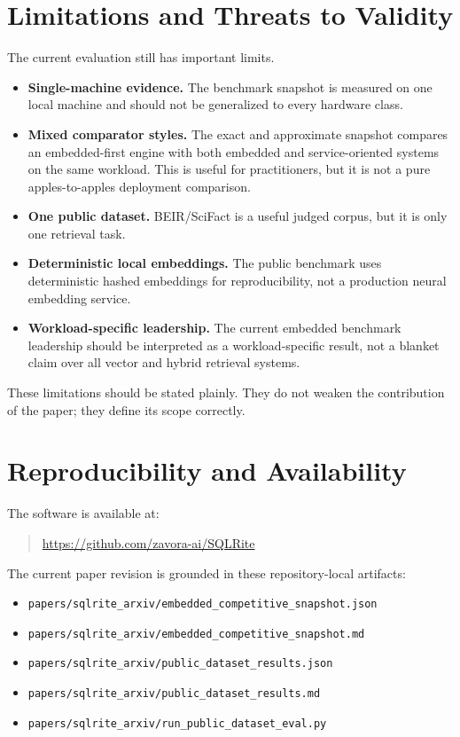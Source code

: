 \documentclass[11pt]{article}
\begin{document}
\section{Limitations and Threats to Validity}
The current evaluation still has important limits.
\begin{itemize}[leftmargin=*, itemsep=0.2em]
  \item \textbf{Single-machine evidence.} The benchmark snapshot is measured on one local machine and should not be generalized to every hardware class.
  \item \textbf{Mixed comparator styles.} The exact and approximate snapshot compares an embedded-first engine with both embedded and service-oriented systems on the same workload. This is useful for practitioners, but it is not a pure apples-to-apples deployment comparison.
  \item \textbf{One public dataset.} BEIR/SciFact is a useful judged corpus, but it is only one retrieval task.
  \item \textbf{Deterministic local embeddings.} The public benchmark uses deterministic hashed embeddings for reproducibility, not a production neural embedding service.
  \item \textbf{Workload-specific leadership.} The current embedded benchmark leadership should be interpreted as a workload-specific result, not a blanket claim over all vector and hybrid retrieval systems.
\end{itemize}

These limitations should be stated plainly. They do not weaken the contribution of the paper; they define its scope correctly.

\section{Reproducibility and Availability}
The software is available at:
\begin{quote}
  \url{https://github.com/zavora-ai/SQLRite}
\end{quote}

The current paper revision is grounded in these repository-local artifacts:
\begin{itemize}[leftmargin=*, itemsep=0.2em]
  \item \texttt{papers/sqlrite\_arxiv/embedded\_competitive\_snapshot.json}
  \item \texttt{papers/sqlrite\_arxiv/embedded\_competitive\_snapshot.md}
  \item \texttt{papers/sqlrite\_arxiv/public\_dataset\_results.json}
  \item \texttt{papers/sqlrite\_arxiv/public\_dataset\_results.md}
  \item \texttt{papers/sqlrite\_arxiv/run\_public\_dataset\_eval.py}
\end{itemize}
\end{document}
